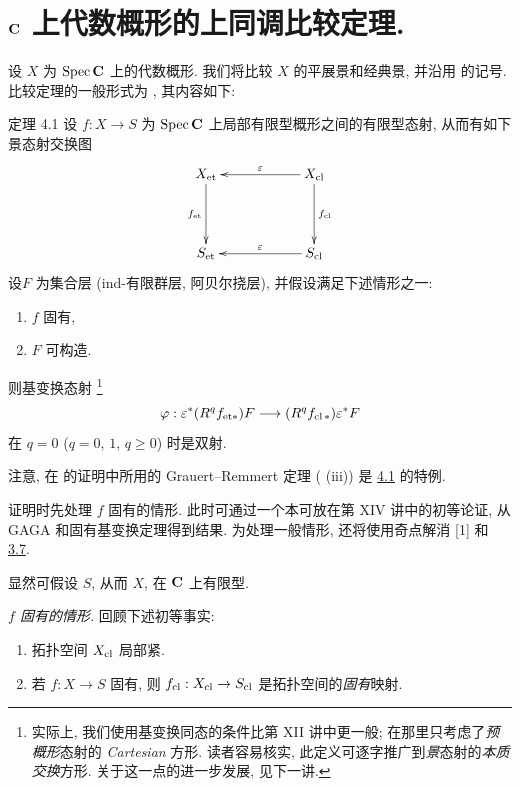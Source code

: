 \section{$\mathbf{C}$ 上代数概形的上同调比较定理.}

设 $X$ 为 $\operatorname{Spec} \mathbf{C}$ 上的代数概形. 我们将比较 $X$ 的平展景和经典景, 并沿用  的记号. 比较定理的一般形式为 , 其内容如下:

\begin{enonce*}{定理 4.1}
设 $f:X\rightarrow S$ 为 $\operatorname{Spec} \mathbf{C}$ 上局部有限型概形之间的有限型态射, 从而有如下景态射交换图
$$
\xymatrix@C=2cm@R=1.5cm{
X_{\et}  \ar[d]_{f_{\et}}                   &   X_{\cl}
\ar[l]_{\varepsilon} \ar[d]^{f_{\cl}} \\
S_{\et}                    &   S_{\cl}\ar[l]_{\varepsilon}
}
$$
设\pageoriginale $F$ 为集合层 (\resp ind-有限群层, \resp 阿贝尔挠层), 并假设满足下述情形之一:
\begin{enumerate}
\renewcommand{\theenumi}{\roman{enumi}}
\renewcommand{\labelenumi}{(\theenumi)}
\item $f$ 固有,

\item $F$ 可构造.
\end{enumerate}
则基变换态射 
\footnote[1]{实际上, 我们使用基变换同态的条件比第 XII 讲中更一般; 在那里只考虑了\emph{预概形}态射的 \emph{Cartesian} 方形. 读者容易核实, 此定义可逐字推广到\emph{景}态射的\emph{本质交换}方形. 关于这一点的进一步发展, 见下一讲.}
$$
\varphi:\varepsilon^{\ast}(R^{q}f_{\mathrm{et}\ast})F\longrightarrow
(R^{q}f_{\operatorname{cl}\ast})\varepsilon {}^{\ast}F
$$
在 $q=0$ (\resp $q=0$, $1$, \resp $q\geq 0$) 时是双射.
\end{enonce*}

注意, 在  的证明中所用的 Grauert--Remmert 定理 ( (iii)) 是 \hyperref[XVI.thm4.1]{4.1} 的特例.

证明\pageoriginale 时先处理 $f$ 固有的情形. 此时可通过一个本可放在第 XIV 讲中的初等论证, 从 GAGA 和固有基变换定理得到结果. 为处理一般情形, 还将使用奇点解消 [1] 和 \hyperref[XVI.thm3.7]{3.7}.

显然可假设 $S$, 从而 $X$, 在 $\mathbf{C}$ 上有限型.

\emph{$f$ 固有的情形.} 回顾下述初等事实:
\begin{enumerate}
\renewcommand{\theenumi}{\alph{enumi}}
\renewcommand{\labelenumi}{(\theenumi)}
\item 拓扑空间 $X_{\operatorname{cl}}$ 局部紧.

\item 若 $f:X\rightarrow S$ 固有, 则 $f_{\operatorname{cl}}:X_{\operatorname{cl}}\rightarrow S_{\operatorname{cl}}$ 是拓扑空间的\emph{固有}映射.
\end{enumerate}

